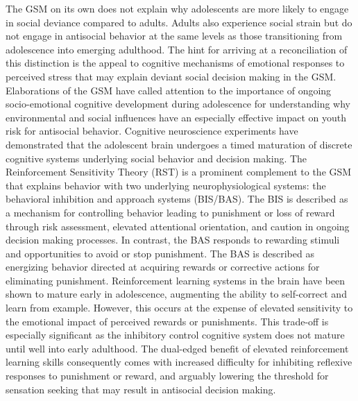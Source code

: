\documentclass[utf8]{article}
\begin{document}
The GSM on its own does not explain why adolescents are more likely to engage in social deviance compared to adults. Adults also experience social strain but do not engage in antisocial behavior at the same levels as those transitioning from adolescence into emerging adulthood. The hint for arriving at a reconciliation of this distinction is the appeal to cognitive mechanisms of emotional responses to perceived stress that may explain deviant social decision making in the GSM. Elaborations of the GSM have called attention to the importance of ongoing socio-emotional cognitive development during adolescence for understanding why environmental and social influences have an especially effective impact on youth risk for antisocial behavior. Cognitive neuroscience experiments have demonstrated that the adolescent brain undergoes a timed maturation of discrete cognitive systems underlying social behavior and decision making. The Reinforcement Sensitivity Theory (RST) is a prominent complement to the GSM that explains behavior with two underlying neurophysiological systems: the behavioral inhibition and approach systems (BIS/BAS). The BIS is described as a mechanism for controlling behavior leading to punishment or loss of reward through risk assessment, elevated attentional orientation, and caution in ongoing decision making processes. In contrast, the BAS responds to rewarding stimuli and opportunities to avoid or stop punishment. The BAS is described as energizing behavior directed at acquiring rewards or corrective actions for eliminating punishment. Reinforcement learning systems in the brain have been shown to mature early in adolescence, augmenting the ability to self-correct and learn from example. However, this occurs at the expense of elevated sensitivity to the emotional impact of perceived rewards or punishments. This trade-off is especially significant as the inhibitory control cognitive system does not mature until well into early adulthood. The dual-edged benefit of elevated reinforcement learning skills consequently comes with increased difficulty for inhibiting reflexive responses to punishment or reward, and arguably lowering the threshold for sensation seeking that may result in antisocial decision making. 
\end{document}
